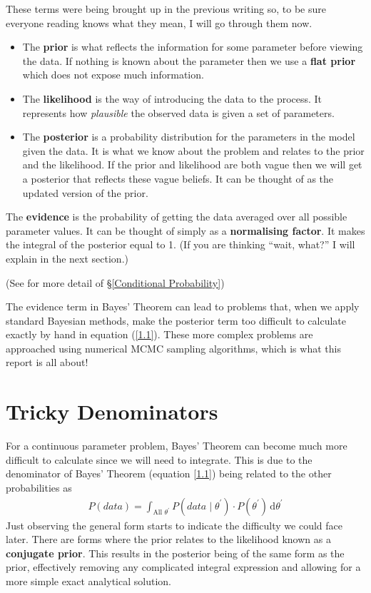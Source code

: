 \documentclass[12pt,twoside]{report}   %
\newcommand{\bb}{\textbf}
\newcommand{\p}{\prime}
\begin{document}
These terms were being brought up in the previous writing so, to be sure everyone reading knows what they mean, I will go through them now.
\begin{itemize}
\item The \textbf{prior} is what reflects the information for some parameter before viewing the data. If nothing is known about the parameter then we use a \textbf{flat prior} which does not expose much information.
\item The \textbf{likelihood} is the way of introducing the data to the process. It represents how \textit{plausible} the observed data is given a set of parameters.
\item The \textbf{posterior} is a probability distribution for the parameters in the model given the data. It is what we know about the problem and relates to the prior and the likelihood. If the prior and likelihood are both vague then we will get a posterior that reflects these vague beliefs. It can be thought of as the updated version of the prior.
\end{itemize}
The \textbf{evidence} is the probability of getting the data averaged over all possible parameter values. It can be thought of simply as a \textbf{normalising factor}. It makes the integral of the posterior equal to 1. (If you are thinking ``wait, what?'' I will explain in the next section.)

(See \cite{2} for more detail of \S\ref{Conditional Probability})

The evidence term in Bayes' Theorem can lead to problems that, when we apply standard Bayesian methods, make the posterior term too difficult to calculate exactly by hand in equation (\ref{1.1}). These more complex problems are approached using numerical  MCMC sampling algorithms, which is what this report is all about!

\section{Tricky Denominators}\label{Tricky Denominators}
\vspace{-0.4in}
\underline{\hspace{6.2in}}
\vspace{-0.1in}

For a continuous parameter problem, Bayes' Theorem can become much more difficult to calculate since we will need to integrate. This is due to the denominator of Bayes' Theorem (equation \ref{1.1}) being related to the other probabilities as
\begin{align}
P(data) = \int_{\text{All }\theta^\p} P(data\mid \theta^\p)\cdot P(\theta^\p)\,\mathrm{d}\theta^\p\label{1.2}
\end{align}
Just observing the general form starts to indicate the difficulty we could face later. There are forms where the prior relates to the likelihood known as a \bb{conjugate prior}. This results in the posterior being of the same form as the prior, effectively removing any complicated integral expression and allowing for a more simple exact analytical solution. 
\end{document}

